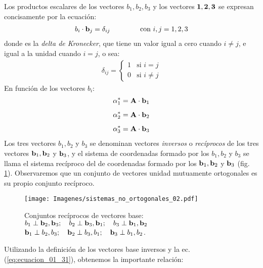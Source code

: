 \documentclass[12pt]{article}
\begin{document}
Los productos escalares de los vectores $b_{1}, b_{2}, b_{3}$ y los vectores $\vb{1}, \vb{2}, \vb{3}$ se expresan concisamente por la ecuación:
\begin{align}
    b_{i} \cdot \vb{b}_{j} = \delta_{ij} \hspace{1.5cm} \text{con } i, j = 1, 2, 3
    \label{eq:ecuacion_01_38}
\end{align}
donde es la \emph{delta de Kronecker}, que tiene un valor igual a cero cuando $i \neq j$, e igual a la unidad cuando $i = j$, o sea:
\begin{align}
    \delta_{ij} = \begin{cases}
        1 & \text{si } i = j \\[0.5em]
        0 & \text{si } i \neq j
    \end{cases}
    \label{eq:ecuacion_01_39}
\end{align}
En función de los vectores $b_{i}$:
\begin{align}
\begin{aligned}
    \alpha_{1}^{*} = \vb{A} \cdot \vb{b}_{1} \\[0.5em]
    \alpha_{2}^{*} = \vb{A} \cdot \vb{b}_{2} \\[0.5em]
    \alpha_{3}^{*} = \vb{A} \cdot \vb{b}_{3}
\end{aligned}
    \label{eq:ecuacion_01_40}   
\end{align}
Los tres vectores $b_{1}, b_{2}$ y $b_{3}$ se denominan vectores \emph{inversos} o \emph{recíprocos} de los tres vectores $\vb{b}_{1}, \vb{b}_{2}$ y $\vb{b}_{3}$, y el sistema de coordenadas formado por los $b_{1}, b_{2}$ y $b_{3}$ se llama el sistema recíproco del de coordenadas formado por los $\vb{b}_{1}, \vb{b}_{2}$ y $\vb{b}_{3}$ (fig. \ref{fig:figura_01_13}). Observaremos que un conjunto de vectores unidad mutuamente ortogonales es su propio conjunto recíproco.
\begin{figure}[H]
    \centering
    \texttt{[image: Imagenes/sistemas\_no\_ortogonales\_02.pdf]}
    \caption{Conjuntos recíprocos de vectores base: \\
    \centering $b_{1} \perp \vb{b}_{2}, \vb{b}_{3}; \quad b_{2} \perp \vb{b}_{3}, \vb{b}_{1}; \quad b_{3} \perp \vb{b}_{1}, \vb{b}_{2}$ \break \hfill
    \centering $\vb{b}_{1} \perp b_{2}, b_{3}; \quad \vb{b}_{2} \perp b_{3}, b_{1}; \quad \vb{b}_{3} \perp b_{1}, b_{2}$.}
    \label{fig:figura_01_13}
\end{figure}
Utilizando la definición de los vectores base inversos y la ec. (\ref{eq:ecuacion_01_31}), obtenemos la importante relación:
\end{document}
